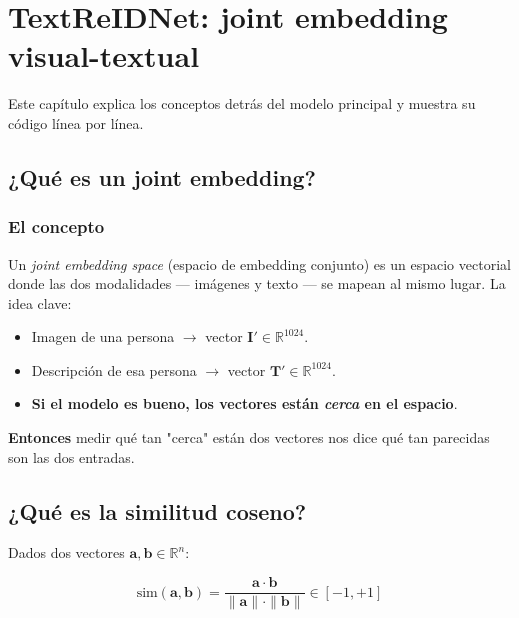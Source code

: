\chapter{TextReIDNet: joint embedding visual-textual}
\label{cap:textreidnet}

Este capítulo explica los conceptos detrás del modelo principal y
muestra su código línea por línea.

\section{¿Qué es un joint embedding?}

\subsection{El concepto}

Un \emph{joint embedding space} (espacio de embedding conjunto)
es un espacio vectorial donde las dos modalidades --- imágenes
y texto --- se mapean al mismo lugar. La idea clave:

\begin{itemize}
  \item Imagen de una persona $\to$ vector $\mathbf{I}' \in
        \mathbb{R}^{1024}$.
  \item Descripción de esa persona $\to$ vector $\mathbf{T}' \in
        \mathbb{R}^{1024}$.
  \item \textbf{Si el modelo es bueno, los vectores están
        \emph{cerca} en el espacio}.
\end{itemize}

\noindent\textbf{Entonces} medir qué tan "cerca" están dos
vectores nos dice qué tan parecidas son las dos entradas.

\section{¿Qué es la similitud coseno?}

Dados dos vectores $\mathbf{a}, \mathbf{b} \in \mathbb{R}^n$:

\begin{equation}
  \text{sim}(\mathbf{a}, \mathbf{b}) = \frac{\mathbf{a} \cdot \mathbf{b}}
                                            {\|\mathbf{a}\| \cdot \|\mathbf{b}\|}
  \in [-1, +1]
  \label{eq:cosine}
\end{equation}

